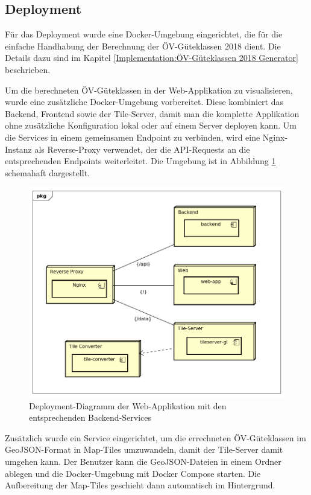 \subsection{Deployment}
\label{Infrastruktur:Deployment}

Für das Deployment wurde eine Docker-Umgebung eingerichtet, die für die einfache Handhabung der Berechnung der \acs{ÖV}-Güteklassen 2018 dient.
Die Details dazu sind im Kapitel \ref{Implementation:ÖV-Güteklassen 2018 Generator} beschrieben.

Um die berechneten \acs{ÖV}-Güteklassen in der Web-Applikation zu visualisieren, wurde eine zusätzliche Docker-Umgebung vorbereitet.
Diese kombiniert das Backend, Frontend sowie der Tile-Server, damit man die komplette Applikation ohne zusätzliche Konfiguration lokal oder auf einem Server deployen kann.
Um die Services in einem gemeinsamen Endpoint zu verbinden, wird eine Nginx-Instanz als Reverse-Proxy verwendet, der die \acs{API}-Requests an die entsprechenden Endpoints weiterleitet.
Die Umgebung ist in Abbildung \ref{fig:deployment_web-app} schemahaft dargestellt.

\begin{figure}[ht]
    \centering
    \includegraphics[width=0.8\linewidth]{projectdoc/img/deployment_web-app}
    \caption[Deployment-Diagramm der Web-Applikation]{Deployment-Diagramm der Web-Applikation mit den entsprechenden Backend-Services}
    \label{fig:deployment_web-app}
\end{figure}

Zusätzlich wurde ein Service eingerichtet, um die errechneten \acs{ÖV}-Güteklassen im GeoJSON-Format in Map-Tiles umzuwandeln, damit der Tile-Server damit umgehen kann.
Der Benutzer kann die GeoJSON-Dateien in einem Ordner ablegen und die Docker-Umgebung mit Docker Compose starten.
Die Aufbereitung der Map-Tiles geschieht dann automatisch im Hintergrund.